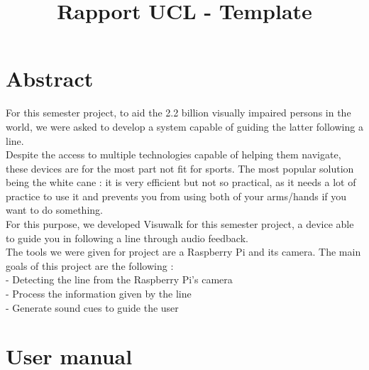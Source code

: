 \documentclass{rapport}
\title{Rapport UCL - Template} %
\begin{document}



        
\fairemarges %
\fairepagedegarde %
\tableofcontents%
\newpage

\section{Abstract}


For this semester project, to aid the 2.2 billion visually impaired persons in the world, we were asked to develop a system capable of guiding the latter following a line.\\ Despite the access to multiple technologies capable of helping them navigate, these devices are for the most part not fit for sports. The most popular solution being the white cane : it is very efficient but not so practical, as it needs a lot of practice to use it and prevents you from using both of your arms/hands if you want to do something.\\For this purpose, we developed Visuwalk for this semester project, a device able to guide you in following a line through audio feedback.\\
The tools we were given for project are a Raspberry Pi and its camera. The main goals of this project are the following :\\
- Detecting the line from the Raspberry Pi’s camera\\
- Process the information given by the line\\
- Generate sound cues to guide the user

\section {User manual}
\end{document}
